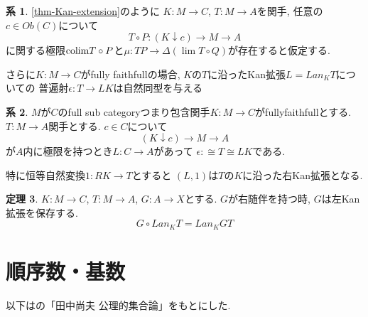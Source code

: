 \documentclass[dvipdfmx,a4paper,11pt]{article}
\newcommand{\colim}{{\rm colim}}
\theoremstyle{definition}
\newtheorem{thm}{定理}
\newtheorem{cor}[thm]{系}
\begin{document}
 \begin{tcolorbox}
 [colback = white, colframe = green!35!black, fonttitle = \bfseries,breakable = true]
\begin{cor}
\ref{thm-Kan-extension}のように
$K : M \to C$, $T : M \to A$を関手, 
任意の$c \in Ob(C)$について
$$
T \circ P : (K \downarrow c) \to M \to A
$$
に関する極限$\colim T\circ P$と$\mu:  TP \to \Delta (\lim T\circ Q)$が存在すると仮定する.

さらに$K : M \to C$がfully faithfullの場合, 
$K$の$T$に沿ったKan拡張$L = Lan_{K}T$についての
普遍射$\epsilon : T \to LK$は自然同型を与える
\end{cor}
\end{tcolorbox}

 \begin{tcolorbox}
 [colback = white, colframe = green!35!black, fonttitle = \bfseries,breakable = true]
\begin{cor}
$M$が$C$のfull sub categoryつまり包含関手$K : M \to C$がfullyfaithfullとする. 
$T : M \to A$関手とする. 
$c \in C$について
$$
( K \downarrow c) \to M \to A
$$
が$A$内に極限を持つとき$L : C \to A$があって
$\epsilon :  \cong T \cong LK$である.

特に恒等自然変換$1: RK \to T$とすると
$(L,1)$は$T$の$K$に沿った右Kan拡張となる. 
\end{cor}
\end{tcolorbox}

 \begin{tcolorbox}
 [colback = white, colframe = green!35!black, fonttitle = \bfseries,breakable = true]
\begin{thm}
$K : M \to C$, $T : M \to A$, $G :  A \to X$とする.
$G$が右随伴を持つ時, $G$は左Kan拡張を保存する. 
$$
G \circ Lan_{K} T = Lan_{K}GT
$$
\end{thm}
\end{tcolorbox}

\newpage

\section{順序数・基数}
以下は\cite{Tana}の「田中尚夫 公理的集合論」をもとにした. 
\end{document}
